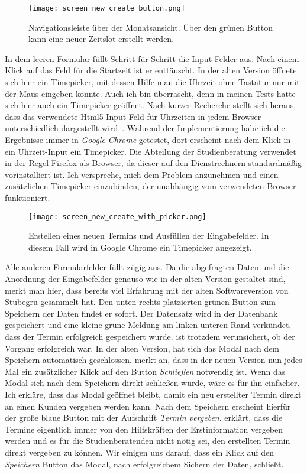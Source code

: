 \begin{figure}[H]
    \caption{Navigationsleiste über der Monatsansicht. Über den grünen Button kann eine neuer Zeitslot erstellt werden.}
    \centering
    \texttt{[image: screen\_new\_create\_button.png]}
\end{figure}

In dem leeren Formular füllt \ipName Schritt für Schritt die Input Felder aus.
Nach einem Klick auf das Feld für die Startzeit ist er enttäuscht. In der alten
Version öffnete sich hier ein \gls{Timepicker}, mit dessen Hilfe man die Uhrzeit
ohne Tastatur nur mit der Maus eingeben konnte. Auch ich bin überrascht, denn
in meinen Tests hatte sich hier auch ein Timepicker geöffnet. Nach kurzer
Recherche stellt sich heraus, dass das verwendete Html5 Input Feld für
Uhrzeiten in jedem Browser unterschiedlich dargestellt
wird~\cite{htmlTimeInput}. Während der Implementierung habe ich die Ergebnisse
immer in \textit{Google Chrome} getestet, dort erscheint nach dem Klick in ein
Uhrzeit-Input ein Timepicker. Die Abteilung der Studienberatung verwendet in
der Regel Firefox als Browser, da dieser auf den Dienstrechnern standardmäßig
vorinstalliert ist. Ich verspreche, mich dem Problem anzunehmen und einen
zusätzlichen Timepicker einzubinden, der unabhängig vom verwendeten Browser
funktioniert.

\begin{figure}[H]
    \caption{Erstellen eines neuen Termins und Ausfüllen der Eingabefelder. In diesem Fall wird in Google Chrome ein Timepicker angezeigt.}
    \centering
    \texttt{[image: screen\_new\_create\_with\_picker.png]}
\end{figure}

Alle anderen Formularfelder füllt \ipName zügig aus. Da die abgefragten Daten
und die Anordnung der Eingabefelder genauso wie in der alten Version gestaltet
sind, merkt man hier, dass \ipName bereits viel Erfahrung mit der alten
Softwareversion von Stubegru gesammelt hat. Den unten rechts platzierten grünen
Button zum Speichern der Daten findet er sofort. Der Datensatz wird in der
Datenbank gespeichert und eine kleine grüne Meldung am linken unteren Rand
verkündet, dass der Termin erfolgreich gespeichert wurde. \ipName ist trotzdem
verunsichert, ob der Vorgang erfolgreich war. In der alten Version, hat sich
das Modal nach dem Speichern automatisch geschlossen. \ipName merkt an, dass in
der neuen Version nun jedes Mal ein zusätzlicher Klick auf den Button
\textit{Schließen} notwendig ist. Wenn das Modal sich nach dem Speichern direkt
schließen würde, wäre es für ihn einfacher. Ich erkläre, dass das Modal
geöffnet bleibt, damit ein neu erstellter Termin direkt an einen Kunden
vergeben werden kann. Nach dem Speichern erscheint hierfür der große blaue
Button mit der Aufschrift \textit{Termin vergeben}. \ipName erklärt, dass die
Termine eigentlich immer von den Hilfskräften der Erstinformation vergeben
werden und es für die Studienberatenden nicht nötig sei, den erstellten Termin
direkt vergeben zu können. Wir einigen uns darauf, dass ein Klick auf den
\textit{Speichern} Button das Modal, nach erfolgreichem Sichern der Daten,
schließt.

